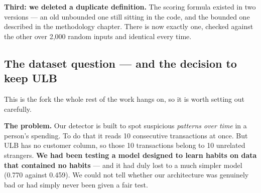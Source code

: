 \documentclass[11pt]{article}
\begin{document}
\textbf{Third: we deleted a duplicate definition.} The scoring formula existed in two versions --- an old
unbounded one still sitting in the code, and the bounded one described in the methodology chapter. There
is now exactly one, checked against the other over 2{,}000 random inputs and identical every time.

\subsection{The dataset question --- and the decision to keep ULB}
\label{sec:ulb}

This is the fork the whole rest of the work hangs on, so it is worth setting out carefully.

\textbf{The problem.} Our detector is built to spot suspicious \emph{patterns over time} in a person's
spending. To do that it reads 10 consecutive transactions at once. But ULB has no customer column, so
those 10 transactions belong to 10 unrelated strangers. \textbf{We had been testing a model designed to
learn habits on data that contained no habits} --- and it had duly lost to a much simpler model (0.770
against 0.459). We could not tell whether our architecture was genuinely bad or had simply never been
given a fair test.
\end{document}
